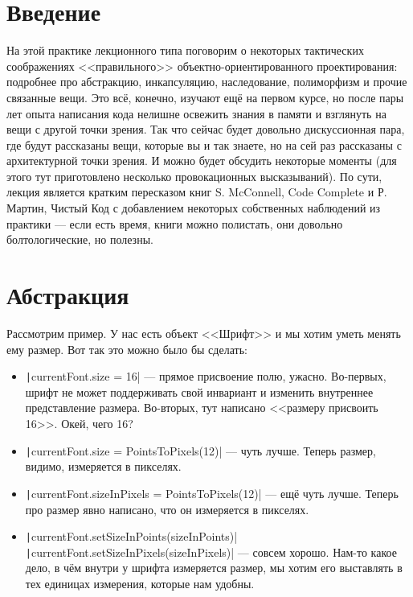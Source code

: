 \documentclass{../../text-style}
\begin{document}
\maketitle
\thispagestyle{empty}

\section{Введение}

На этой практике лекционного типа поговорим о некоторых тактических соображениях <<правильного>> объектно-ориентированного проектирования: подробнее про абстракцию, инкапсуляцию, наследование, полиморфизм и прочие связанные вещи. Это всё, конечно, изучают ещё на первом курсе, но после пары лет опыта написания кода нелишне освежить знания в памяти и взглянуть на вещи с другой точки зрения. Так что сейчас будет довольно дискуссионная пара, где будут рассказаны вещи, которые вы и так знаете, но на сей раз рассказаны с архитектурной точки зрения. И можно будет обсудить некоторые моменты (для этого тут приготовлено несколько провокационных высказываний). По сути, лекция является кратким пересказом книг S. McConnell, Code Complete и Р. Мартин, Чистый Код с добавлением некоторых собственных наблюдений из практики --- если есть время, книги можно полистать, они довольно болтологические, но полезны.

\section{Абстракция}

Рассмотрим пример. У нас есть объект <<Шрифт>> и мы хотим уметь менять ему размер. Вот так это можно было бы сделать:

\begin{itemize}
    \item \texttt|currentFont.size = 16| --- прямое присвоение полю, ужасно. Во-первых, шрифт не может поддерживать свой инвариант и изменить внутреннее представление размера. Во-вторых, тут написано <<размеру присвоить 16>>. Окей, чего 16?
    \item \texttt|currentFont.size = PointsToPixels(12)| --- чуть лучше. Теперь размер, видимо, измеряется в пикселях.
    \item \texttt|currentFont.sizeInPixels = PointsToPixels(12)| --- ещё чуть лучше. Теперь про размер явно написано, что он измеряется в пикселях.
    \item \texttt|currentFont.setSizeInPoints(sizeInPoints)| \newline
            \texttt|currentFont.setSizeInPixels(sizeInPixels)| --- совсем хорошо. Нам-то какое дело, в чём внутри у шрифта измеряется размер, мы хотим его выставлять в тех единицах измерения, которые нам удобны.
\end{itemize}
\end{document}
